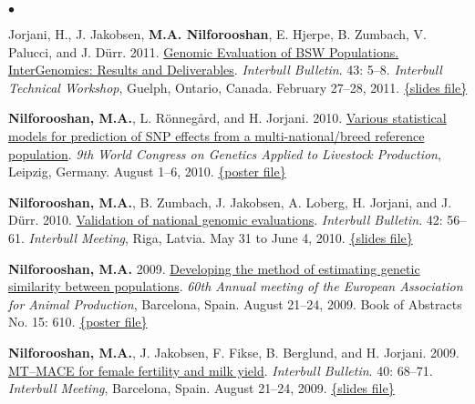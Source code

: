 \documentclass[margin,line]{res}
\newenvironment{list2}{
  \begin{list}{$\bullet$}{%
      \setlength{\itemsep}{0in}
      \setlength{\parsep}{0in} \setlength{\parskip}{0in}
      \setlength{\topsep}{0in} \setlength{\partopsep}{0in}
      \setlength{\leftmargin}{0.2in}}}{\end{list}}
\begin{document}
\begin{resume}
\begin{list2}
    \item Jorjani, H., J. Jakobsen, {\bf M.A. Nilforooshan}, E. Hjerpe, B. Zumbach, V. Palucci, and J. D\"{u}rr. 2011. \href{https://www.researchgate.net/publication/265218200_Genomic_Evaluation_of_BSW_Populations_InterGenomics_Results_and_Deliverables}{Genomic Evaluation of BSW Populations. InterGenomics: Results and Deliverables}. {\em Interbull Bulletin}. 43: 5--8. {\em Interbull Technical Workshop}, Guelph, Ontario, Canada. February 27--28, 2011. \href{https://drive.google.com/file/d/0B2l_izQwJmVpbGh3ZC1iRWhCWVE/view?usp=sharing&resourcekey=0-BFevbAqrR4lVT5anezUffQ}{\{slides file\}}
    \item {\bf Nilforooshan, M.A.}, L. R\"{o}nneg\r{a}rd, and H. Jorjani. 2010. \href{https://www.researchgate.net/publication/267973054_Various_Statistical_Models_For_Prediction_Of_SNP_Effects_From_A_Multi-NationalBreed_Reference_Population}{Various statistical models for prediction of SNP effects from a multi-national/breed reference population}. {\em 9th World Congress on Genetics Applied to Livestock Production}, Leipzig, Germany. August 1--6, 2010. \href{https://doi.org/10.13140/RG.2.2.36673.22881}{\{poster file\}}
    \item {\bf Nilforooshan, M.A.}, B. Zumbach, J. Jakobsen, A. Loberg, H. Jorjani, and J. D\"{u}rr. 2010. \href{https://www.researchgate.net/publication/358199921_Validation_of_National_Genomic_Evaluations}{Validation of national genomic evaluations}. {\em Interbull Bulletin}. 42: 56--61. {\em Interbull Meeting}, Riga, Latvia. May 31 to June 4, 2010. \href{https://drive.google.com/file/d/0B2l_izQwJmVpRnlPa0YzS3ZCU1E/view?usp=sharing&resourcekey=0-Tsw-3ZQhJPn8Cm8kG1E6xw}{\{slides file\}}
    \item {\bf Nilforooshan, M.A.} 2009. \href{https://www.researchgate.net/publication/358219264_Developing_the_method_of_estimating_genetic_similarity_between_populations}{Developing the method of estimating genetic similarity between populations}. {\em 60th Annual meeting of the European Association for Animal Production}, Barcelona, Spain. August 21--24, 2009. Book of Abstracts No. 15: 610. \href{https://doi.org/10.13140/RG.2.2.11140.40320}{\{poster file\}}
    \item {\bf Nilforooshan, M.A.}, J. Jakobsen, F. Fikse, B. Berglund, and H. Jorjani. 2009. \href{https://www.researchgate.net/publication/239611615_MT-MACE_for_Female_Fertility_and_Milk_Yield}{MT–MACE for female fertility and milk yield}. {\em Interbull Bulletin}. 40: 68--71. {\em Interbull Meeting}, Barcelona, Spain. August 21--24, 2009. \href{https://drive.google.com/file/d/0B2l_izQwJmVpRTlrOGE3OWluVnc/view?usp=sharing&resourcekey=0-LiA6IgIqSEjLxrAFkXL_Bw}{\{slides file\}}

\end{list2}
\end{resume}
\end{document}
